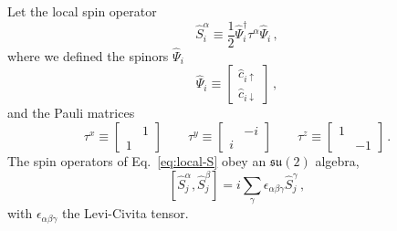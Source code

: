 Let the local spin operator
\begin{equation}\label{eq:local-S}
	\hat S_i^\alpha \equiv \frac{1}{2} \hat \Psi_i^\dagger \tau^\alpha \hat \Psi_i \, ,
\end{equation}
where we defined the spinors $\hat \Psi_i$
\begin{equation}\label{eq:Psi-onsite}
	\hat \Psi_i \equiv \begin{bmatrix}
		\hat c_{i\uparrow} \\ \hat c_{i\downarrow}
	\end{bmatrix} \, ,
\end{equation}
and the Pauli matrices
\[
	\tau^x \equiv \begin{bmatrix}
		& 1 \\
		1 &
	\end{bmatrix}
	\qquad
	\tau^y \equiv \begin{bmatrix}
		& -i \\
		i &
	\end{bmatrix}
	\qquad
	\tau^z \equiv \begin{bmatrix}
		1 & \\
		& -1
	\end{bmatrix} \, .
\]
The spin operators of Eq.~\eqref{eq:local-S} obey an $\mathfrak{su}(2)$ algebra,
\begin{equation}\label{eq:local-su(2)}
	\left[ \hat S_j^\alpha, \hat S_j^\beta \right] = i \sum_\gamma \epsilon_{\alpha\beta\gamma} \hat S_j^\gamma \, ,
\end{equation}
with $\epsilon_{\alpha\beta\gamma}$ the Levi-Civita tensor.

